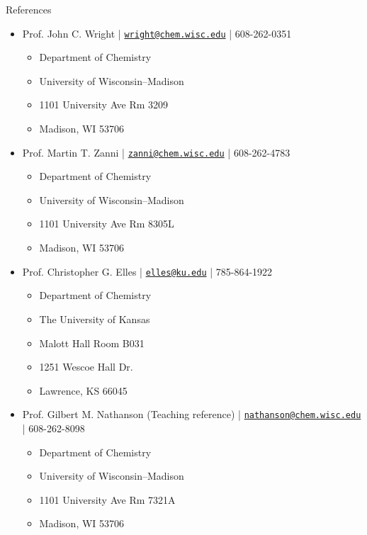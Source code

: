 \documentclass{resume} %
\begin{document}
\begin{rSection}{References}
	\begin{itemize}[leftmargin = 0 pt]
		\item Prof. John C. Wright | \href{mailto:wright@chem.wisc.edu}{\texttt{wright@chem.wisc.edu}} | 608-262-0351
		\begin{itemize}
			\item[] Department of Chemistry
			\item[] University of Wisconsin--Madison
			\item[] 1101 University Ave Rm 3209
			\item[] Madison, WI 53706
		\end{itemize}	
		\item Prof. Martin T. Zanni | \href{mailto:zanni@chem.wisc.edu}{\texttt{zanni@chem.wisc.edu}} | 608-262-4783
		\begin{itemize}
			\item[] Department of Chemistry
			\item[] University of Wisconsin--Madison
			\item[] 1101 University Ave Rm 8305L
			\item[] Madison, WI 53706
		\end{itemize}
		
		\item Prof. Christopher G. Elles | \href{mailto:elles@ku.edu}{\texttt{elles@ku.edu}} | 785-864-1922
		\begin{itemize}
			\item[] Department of Chemistry
			\item[] The University of Kansas
			\item[] Malott Hall Room B031
			\item[] 1251 Wescoe Hall Dr.
			\item[] Lawrence, KS 66045 
		\end{itemize}		
		\item Prof. Gilbert M. Nathanson (Teaching reference) | \href{mailto:nathanson@chem.wisc.edu}{\texttt{nathanson@chem.wisc.edu}} | 608-262-8098
		\begin{itemize}
			\item[] Department of Chemistry
			\item[] University of Wisconsin--Madison
			\item[] 1101 University Ave Rm 7321A
			\item[] Madison, WI 53706
		\end{itemize}
	\end{itemize}
\end{rSection}
\end{document}
